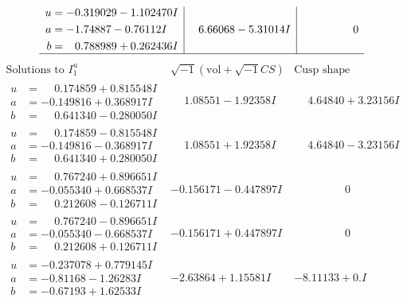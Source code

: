 \documentclass[1p]{elsarticle_modified}
\theoremstyle{definition}
\newcommand{\I}{\sqrt{-1}}
\begin{document}
$$\begin{array}{c|c|c}
\begin{aligned}
u &= -0.319029 - 1.102470 I \\
a &= -1.74887 - 0.76112 I \\
b &= \phantom{-}0.788989 + 0.262436 I\end{aligned}
 & \phantom{-}6.66068 - 5.31014 I & \phantom{-0.000000 } 0\\
 \hline 
 \end{array}$$\newpage$$\begin{array}{c|c|c}  
\text{Solutions to }I^u_{1}& \I (\text{vol} + \sqrt{-1}CS) & \text{Cusp shape}\\
 \hline 
\begin{aligned}
u &= \phantom{-}0.174859 + 0.815548 I \\
a &= -0.149816 + 0.368917 I \\
b &= \phantom{-}0.641340 - 0.280050 I\end{aligned}
 & \phantom{-}1.08551 - 1.92358 I & \phantom{-}4.64840 + 3.23156 I \\ \hline\begin{aligned}
u &= \phantom{-}0.174859 - 0.815548 I \\
a &= -0.149816 - 0.368917 I \\
b &= \phantom{-}0.641340 + 0.280050 I\end{aligned}
 & \phantom{-}1.08551 + 1.92358 I & \phantom{-}4.64840 - 3.23156 I \\ \hline\begin{aligned}
u &= \phantom{-}0.767240 + 0.896651 I \\
a &= -0.055340 + 0.668537 I \\
b &= \phantom{-}0.212608 - 0.126711 I\end{aligned}
 & -0.156171 - 0.447897 I & \phantom{-0.000000 } 0 \\ \hline\begin{aligned}
u &= \phantom{-}0.767240 - 0.896651 I \\
a &= -0.055340 - 0.668537 I \\
b &= \phantom{-}0.212608 + 0.126711 I\end{aligned}
 & -0.156171 + 0.447897 I & \phantom{-0.000000 } 0 \\ \hline\begin{aligned}
u &= -0.237078 + 0.779145 I \\
a &= -0.81168 - 1.26283 I \\
b &= -0.67193 + 1.62533 I\end{aligned}
 & -2.63864 + 1.15581 I & -8.11133 + 0. I\phantom{ +0.000000I} \\ \hline\begin{aligned}

\end{aligned}
\end{array}$$
\end{document}
